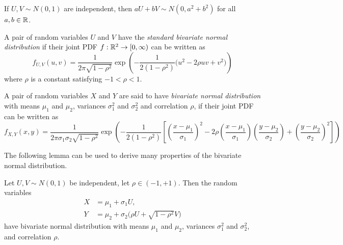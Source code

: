 \begin{corollary}\label{cor:lin_comb_std_normal}
If $U,V\sim N(0,1)$ are independent, then $aU+bV\sim N(0,a^2+b^2)$ for all $a,b\in\mathbb{R}$.
\end{corollary}
%

\newpage

\begin{definition}\label{def:standard_bivariate_normal}
A pair of random variables $U$ and $V$ have the \emph{standard bivariate normal distribution} if their joint PDF $f:\mathbb{R}^2\to[0,\infty)$ can be written as
\[
f_{U,V}(u,v) = \frac{1}{2\pi\sqrt{1-\rho^2}}\exp\left(-\frac{1}{2(1-\rho^2)}\big(u^2 - 2	\rho uv + v^2\big)\right)
\]
where $\rho$ is a constant satisfying $-1 < \rho < 1$.
\end{definition}

\begin{definition}\label{def:bivariate_normal}
A pair of random variables $X$ and $Y$ are said to have \emph{bivariate normal distribution} with means $\mu_1$ and $\mu_2$, variances $\sigma_1^2$ and $\sigma_2^2$ and correlation $\rho$, if their joint PDF can be written as
\[
f_{X,Y}(x,y)
	= \frac{1}{2\pi\sigma_1\sigma_2\sqrt{1-\rho^2}}
		\exp\left(-\frac{1}{2(1-\rho^2)}\left[\left(\frac{x-\mu_1}{\sigma_1}\right)^2 
			-2\rho\left(\frac{x-\mu_1}{\sigma_1}\right)\left(\frac{y-\mu_2}{\sigma_2}\right) 
				+\left(\frac{y-\mu_2}{\sigma_2}\right)^2 \right]\right)
\]
\normalsize
\end{definition}

The following lemma can be used to derive many properties of the bivariate normal distribution.
\begin{lemma}\label{lem:trick}
Let $U,V\sim N(0,1)$ be independent, let $\rho\in(-1,+1)$. Then the random variables
\begin{align*}
X & = \mu_1 + \sigma_1 U, \\
Y & = \mu_2 + \sigma_2\big(\rho U +\sqrt{1-\rho^2}V\big)
\end{align*}
have bivariate normal distribution with means $\mu_1$ and $\mu_2$, variances $\sigma_1^2$ and $\sigma_2^2$, and correlation $\rho$.
\end{lemma}

